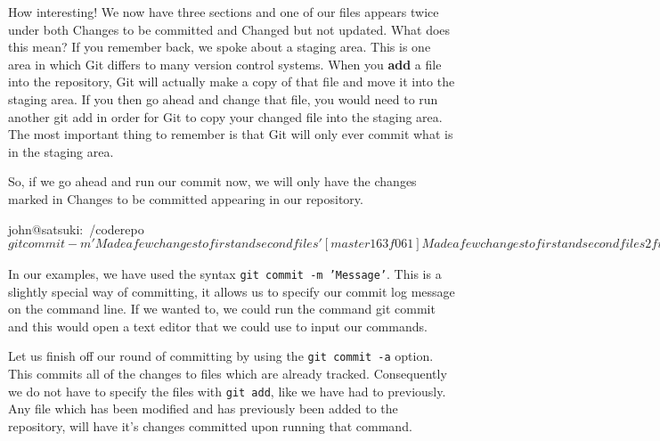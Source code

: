 
How interesting! We now have three sections and one of our files appears twice under both Changes to be committed and Changed but not updated.
What does this mean? If you remember back, we spoke about a staging area.
This is one area in which Git differs to many version control systems.
When you \textbf{add} a file into the repository, Git will actually make a copy of that file and move it into the staging area.
If you then go ahead and change that file, you would need to run another git add in order for Git to copy your changed file into the staging area.
The most important thing to remember is that Git will only ever commit what is in the staging area.

So, if we go ahead and run our commit now, we will only have the changes marked in Changes to be committed appearing in our repository.

\begin{code}
john@satsuki:~/coderepo$ git commit -m 'Made a few changes to first and second files'
[master 163f061] Made a few changes to first and second files
 2 files changed, 2 insertions(+), 0 deletions(-)
 create mode 100644 my_second_committed_file
john@satsuki:~/coderepo$
\end{code}

In our examples, we have used the syntax \texttt{git commit -m 'Message'}.
This is a slightly special way of committing, it allows us to specify our commit log message on the command line.
If we wanted to, we could run the command git commit and this would open a text editor that we could use to input our commands.

Let us finish off our round of committing by using the \texttt{git commit -a} option.
This commits all of the changes to files which are already tracked.
Consequently we do not have to specify the files with \texttt{git add}, like we have had to previously.
Any file which has been modified and has previously been added to the repository, will have it's changes committed upon running that command.

